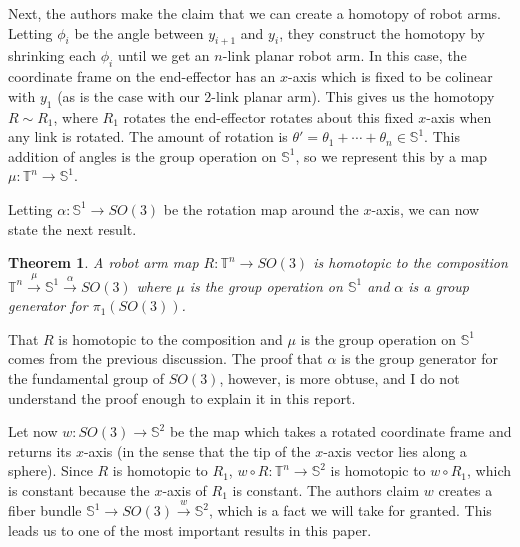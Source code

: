 \documentclass[12pt]{article}
\newtheorem{thm}{Theorem}
\theoremstyle{definition}
\begin{document}
\begin{figure}[h]

    \caption{}\label{fig:planar-singular-frames}
\end{figure}

Next, the authors make the claim that we can create a homotopy of robot arms.
Letting \(\phi_i\) be the angle between \(y_{i+1}\) and \(y_i\), they construct
the homotopy by shrinking each \(\phi_i\) until we get an \(n\)-link planar
robot arm. In this case, the coordinate frame on the end-effector has an 
\(x\)-axis which is fixed to be colinear with \(y_1\) (as is the case with our
2-link planar arm). This gives us the homotopy \(R \sim R_1\), where \(R_1\)
rotates the end-effector rotates about this fixed \(x\)-axis when any link
is rotated. The amount of rotation is 
\(\theta' = \theta_1 + \cdots + \theta_n \in \mathbb{S}^1\). This addition of
angles is the group operation on \(\mathbb{S}^1\), so we represent this by a map
\(\mu : \mathbb{T}^n \rightarrow \mathbb{S}^1\). 

Letting \(\alpha : \mathbb{S}^1 \rightarrow SO(3)\) be the rotation map around
the \(x\)-axis, we can now state the next result.
\begin{thm}
    A robot arm map \(R : \mathbb{T}^n \rightarrow SO(3)\) is homotopic to 
    the composition 
    \(\mathbb{T}^n \xrightarrow{\mu} \mathbb{S}^1 \xrightarrow{\alpha} SO(3)\)
    where \(\mu\) is the group operation on \(\mathbb{S}^1\) and \(\alpha\) is a
    group generator for \(\pi_1\left(SO(3)\right)\).
\end{thm}

That \(R\) is homotopic to the composition and \(\mu\) is the group operation on
\(\mathbb{S}^1\) comes from the previous discussion. The proof that \(\alpha\)
is the group generator for the fundamental group of \(SO(3)\), however, is more
obtuse, and I do not understand the proof enough to explain it in this report. 

Let now \(w : SO(3) \rightarrow \mathbb{S}^2\) be the map which takes a rotated
coordinate frame and returns its \(x\)-axis (in the sense that the tip of the
\(x\)-axis vector lies along a sphere).
Since \(R\) is homotopic to \(R_1\), 
\(w \circ R : \mathbb{T}^n \rightarrow \mathbb{S}^2\) is homotopic to 
\(w \circ R_1\), which is constant because the \(x\)-axis of \(R_1\) is
constant. The authors claim \(w\) creates a fiber bundle 
\(\mathbb{S}^1 \rightarrow SO(3) \xrightarrow{w} \mathbb{S}^2\), which is a fact
we will take for granted. This leads us to one of the most important results in
this paper.
\end{document}
